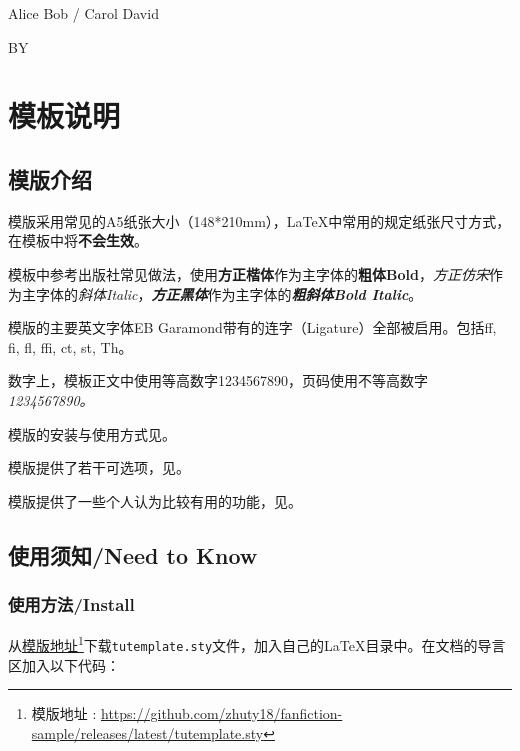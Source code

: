 \documentclass[10pt,openany]{book}
\def\bookcp{Alice Bob / Carol David}
\newcommand{\mytitlepage}{
    \null
    \vfill
    \thispagestyle{empty}

    \begin{center}
        \Huge

        \headfont\labelfontCJK\bfseries

        {\booktitle}

        \vspace{2mm}

        \Large

        \vspace{.3\textheight}

        {\mdseries\bookcp}

        \vspace{2mm}

        {\sbseries BY \bookauthor}
    \end{center}

    \vfill

    \clearpage
}
\newcommand{\link}[2]{\href{#1}{#2}\footnote{#2 : \href{#1}{#1}}}
\begin{document}
\pagestyle{mystyle}

\mytitlepage
\newpage

\tocgeo
\tableofcontents
\thispagestyle{empty}

\cleardoublepage
\setcounter{page}{1}
\restoregeometry

\part{模板说明}

\chapter{模版介绍}

模版采用常见的A5纸张大小（148*210mm），\LaTeX 中常用的规定纸张尺寸方式，在模板中将\textbf{不会生效}。

\blankpar

模板中参考出版社常见做法，使用\textbf{方正楷体}作为主字体的\textbf{粗体Bold}，\textit{方正仿宋}作为主字体的\textit{斜体Italic}，\textbf{\textit{方正黑体}}作为主字体的\textbf{\textit{粗斜体Bold Italic}}。

\blankpar

模版的主要英文字体EB Garamond带有的连字（Ligature）全部被启用。包括ff, fi, fl, ffi, ct, st, Th。

数字上，模板正文中使用等高数字1234567890，页码使用不等高数字\itshape 1234567890\upshape\rmfamily。

\blankpar

模版的安装与使用方式见。

\blankpar

模版提供了若干可选项，见。

\blankpar

模版提供了一些个人认为比较有用的功能，见。

\chapter{使用须知/Need to Know}
\label{template-use}

\section{使用方法/Install}

从\link{https://github.com/zhuty18/fanfiction-sample/releases/latest/tutemplate.sty}{模版地址}下载\texttt{tutemplate.sty}文件，加入自己的\LaTeX 目录中。在文档的导言区加入以下代码：
\end{document}
